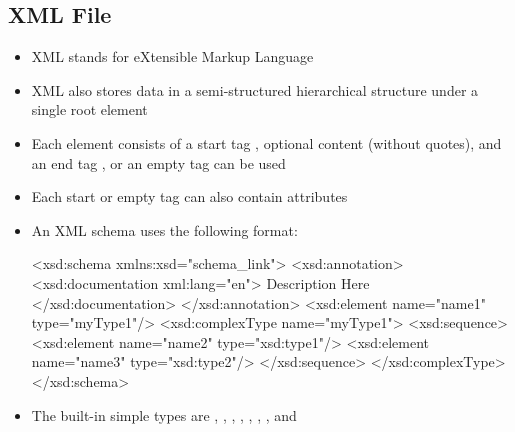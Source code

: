 \documentclass[a4paper]{article}
\begin{document}
\subsection{XML File}
\begin{itemize}
    \item XML stands for eXtensible Markup Language
    \item XML also stores data in a semi-structured hierarchical structure under a single root element
    \item Each element consists of a start tag , optional content (without quotes), and an end tag , or an empty tag  can be used
    \item Each start or empty tag can also contain attributes 
    \item An XML schema uses the following format:
    \begin{xml}
<xsd:schema xmlns:xsd="schema_link">
<xsd:annotation>
  <xsd:documentation xml:lang="en">
    Description Here
  </xsd:documentation>
</xsd:annotation>
<xsd:element name="name1" type="myType1"/>
<xsd:complexType name="myType1">
  <xsd:sequence>
    <xsd:element name="name2" type="xsd:type1"/>
    <xsd:element name="name3" type="xsd:type2"/>
  </xsd:sequence>
</xsd:complexType>
</xsd:schema>
\end{xml}
    \item The built-in simple types are , , , , ,
    , , and 

\end{itemize}
\end{document}
